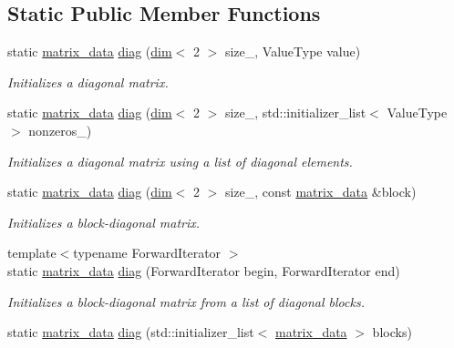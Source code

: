 \subsection*{Static Public Member Functions}
\begin{DoxyCompactItemize}
\item 
static \hyperlink{structgko_1_1matrix__data}{matrix\+\_\+data} \hyperlink{structgko_1_1matrix__data_a307091117617a342b9e576bcc9dd3c80}{diag} (\hyperlink{structgko_1_1dim}{dim}$<$ 2 $>$ size\+\_\+, Value\+Type value)
\begin{DoxyCompactList}\small\item\em Initializes a diagonal matrix. \end{DoxyCompactList}\item 
static \hyperlink{structgko_1_1matrix__data}{matrix\+\_\+data} \hyperlink{structgko_1_1matrix__data_aa80c7201a72ebf5b79a793b8d38db8e2}{diag} (\hyperlink{structgko_1_1dim}{dim}$<$ 2 $>$ size\+\_\+, std\+::initializer\+\_\+list$<$ Value\+Type $>$ nonzeros\+\_\+)
\begin{DoxyCompactList}\small\item\em Initializes a diagonal matrix using a list of diagonal elements. \end{DoxyCompactList}\item 
static \hyperlink{structgko_1_1matrix__data}{matrix\+\_\+data} \hyperlink{structgko_1_1matrix__data_a2d2fb8725ef69679a74f7bd2f627e776}{diag} (\hyperlink{structgko_1_1dim}{dim}$<$ 2 $>$ size\+\_\+, const \hyperlink{structgko_1_1matrix__data}{matrix\+\_\+data} \&block)
\begin{DoxyCompactList}\small\item\em Initializes a block-\/diagonal matrix. \end{DoxyCompactList}\item 
{\footnotesize template$<$typename Forward\+Iterator $>$ }\\static \hyperlink{structgko_1_1matrix__data}{matrix\+\_\+data} \hyperlink{structgko_1_1matrix__data_a83d309b12caf3957c116ed1133da39a7}{diag} (Forward\+Iterator begin, Forward\+Iterator end)
\begin{DoxyCompactList}\small\item\em Initializes a block-\/diagonal matrix from a list of diagonal blocks. \end{DoxyCompactList}\item 
static \hyperlink{structgko_1_1matrix__data}{matrix\+\_\+data} \hyperlink{structgko_1_1matrix__data_aa809c5fbd147b72b18efeca595338398}{diag} (std\+::initializer\+\_\+list$<$ \hyperlink{structgko_1_1matrix__data}{matrix\+\_\+data} $>$ blocks)

\end{DoxyCompactItemize}
